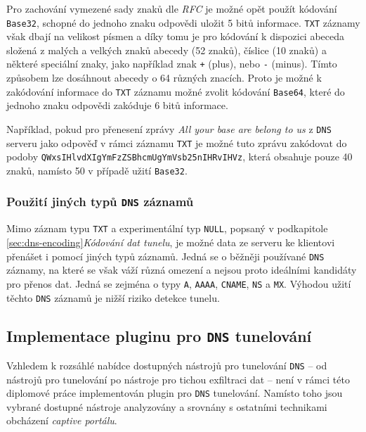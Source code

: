 \documentclass[thesis=M,czech]{FITthesis}[2012/10/20]
\begin{document}
    Pro zachování vymezené sady znaků dle \textit{RFC} je možné opět použít kódování \texttt{Base32}, schopné do jednoho znaku odpovědi uložit 5 bitů informace. \texttt{TXT} záznamy však dbají na velikost písmen a díky tomu je pro kódování k dispozici abeceda složená z malých a velkých znaků abecedy (52 znaků), číslice (10 znaků) a některé speciální znaky, jako například znak \texttt{+} (plus), nebo \texttt{-} (minus). Tímto způsobem lze dosáhnout abecedy o 64 různých znacích. Proto je možné k zakódování informace do \texttt{TXT} záznamu možné zvolit kódování \texttt{Base64}, které do jednoho znaku odpovědi zakóduje 6 bitů informace.
    
    Například, pokud pro přenesení zprávy \textit{All your base are belong to us} z \texttt{DNS} serveru jako odpověď v rámci záznamu \texttt{TXT} je možné tuto zprávu zakódovat do podoby \texttt{QWxsIHlvdXIgYmFzZSBhcmUgYmVsb25nIHRvIHVz}, která obsahuje pouze 40 znaků, namísto 50 v případě užití \texttt{Base32}.
    
    
    \subsubsection{Použití jiných typů \texttt{DNS} záznamů}
    
    Mimo záznam typu \texttt{TXT} a experimentální typ \texttt{NULL}, popsaný v podkapitole \ref{sec:dns-encoding}\textit{Kódování dat tunelu}, je možné data ze serveru ke klientovi přenášet i pomocí jiných typů záznamů. Jedná se o běžněji používané \texttt{DNS} záznamy, na které se však váží různá omezení a nejsou proto ideálními kandidáty pro přenos dat. Jedná se zejména o typy \texttt{A}, \texttt{AAAA}, \texttt{CNAME}, \texttt{NS} a \texttt{MX}. Výhodou užití těchto \texttt{DNS} záznamů je nižší riziko detekce tunelu.
    
    
    \subsection{Implementace pluginu pro \texttt{DNS} tunelování}
    
    Vzhledem k rozsáhlé nabídce dostupných nástrojů pro tunelování \texttt{DNS} -- od nástrojů pro tunelování po nástroje pro tichou exfiltraci dat -- není v rámci této diplomové práce implementován plugin pro \texttt{DNS} tunelování. Namísto toho jsou vybrané dostupné nástroje analyzovány a srovnány s ostatními technikami obcházení \textit{captive portálu}.

    
    
\end{document}
